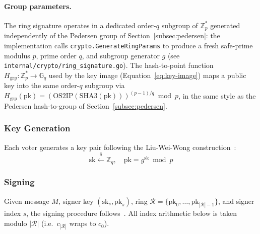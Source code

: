 \paragraph{Group parameters.} The ring signature operates in a dedicated order-$q$ subgroup of $\mathbb{Z}_p^*$ generated independently of the Pedersen group of Section~\ref{subsec:pedersen}: the implementation calls \texttt{crypto.GenerateRingParams} to produce a fresh safe-prime modulus $p$, prime order $q$, and subgroup generator $g$ (see \texttt{internal/crypto/ring\_signature.go}). The hash-to-point function $H_{\text{grp}}: \mathbb{Z}_p^* \to \mathbb{G}_q$ used by the key image (Equation~\ref{eq:key-image}) maps a public key into the same order-$q$ subgroup via $H_{\text{grp}}(\mathrm{pk}) = (\text{OS2IP}(\text{SHA3}(\mathrm{pk})))^{(p-1)/q} \bmod p$, in the same style as the Pedersen hash-to-group of Section~\ref{subsec:pedersen}.

\subsubsection{Key Generation}
\label{subsubsec:ring-keygen}

Each voter generates a key pair following the Liu-Wei-Wong construction~\cite{liu2004}:
\begin{equation}
    \text{sk} \xleftarrow{\$} \mathbb{Z}_q, \quad \text{pk} = g^{\text{sk}} \bmod p
    \label{eq:ring-keygen}
\end{equation}

\subsubsection{Signing}
\label{subsubsec:ring-sign}

Given message $M$, signer key $(\text{sk}_s, \text{pk}_s)$, ring $\mathcal{R} = \{\text{pk}_0, \ldots, \text{pk}_{|\mathcal{R}|-1}\}$, and signer index $s$, the signing procedure follows~\cite{liu2004}. All index arithmetic below is taken modulo $|\mathcal{R}|$ (i.e.\ $c_{|\mathcal{R}|}$ wraps to $c_0$).

